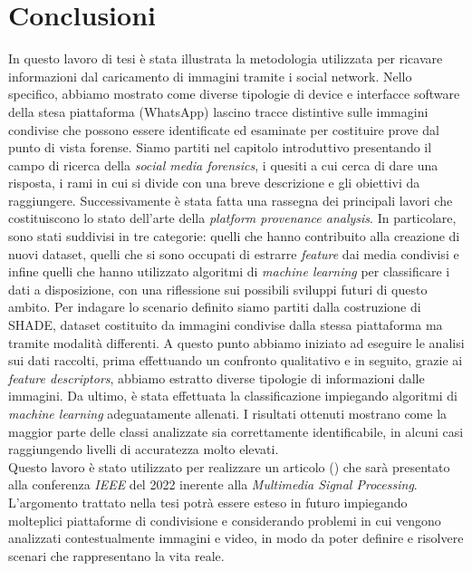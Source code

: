 \chapter{Conclusioni}
\label{cha:conclusioni}

 In questo lavoro di tesi è stata illustrata la metodologia utilizzata per ricavare informazioni dal caricamento di immagini tramite i social network. Nello specifico, abbiamo mostrato come diverse tipologie di device e interfacce software della stesa piattaforma (WhatsApp) lascino tracce distintive sulle immagini condivise che possono essere identificate ed esaminate per costituire prove dal punto di vista forense. Siamo partiti nel capitolo introduttivo presentando il campo di ricerca della \textit{social media forensics}, i quesiti a cui cerca di dare una risposta, i rami in cui si divide con una breve descrizione e gli obiettivi da raggiungere. Successivamente è stata fatta una rassegna dei principali lavori che costituiscono lo stato dell'arte della \textit{platform provenance analysis}. In particolare, sono stati suddivisi in tre categorie: quelli che hanno contribuito alla creazione di nuovi dataset, quelli che si sono occupati di estrarre \textit{feature} dai media condivisi e infine quelli che hanno utilizzato algoritmi di \textit{machine learning} per classificare i dati a disposizione, con una riflessione sui possibili sviluppi futuri di questo ambito. Per indagare lo scenario definito siamo partiti dalla costruzione di SHADE, dataset costituito da immagini condivise dalla stessa piattaforma ma tramite modalità differenti. A questo punto abbiamo iniziato ad eseguire le analisi sui dati raccolti, prima effettuando un confronto qualitativo e in seguito, grazie ai \textit{feature descriptors}, abbiamo estratto diverse tipologie di informazioni dalle immagini. Da ultimo, è stata effettuata la classificazione impiegando algoritmi di \textit{machine learning} adeguatamente allenati. I risultati ottenuti mostrano come la maggior parte delle classi analizzate sia correttamente identificabile, in alcuni casi raggiungendo livelli di accuratezza molto elevati.\\
 Questo lavoro è stato utilizzato per realizzare un articolo (\cite{tomasoni2022device}) che sarà presentato alla conferenza \textit{IEEE} del 2022 inerente alla \textit{Multimedia Signal Processing}. L'argomento trattato nella tesi potrà essere esteso in futuro impiegando molteplici piattaforme di condivisione e considerando problemi in cui vengono analizzati contestualmente immagini e video, in modo da poter definire e risolvere scenari che rappresentano la vita reale.\newpage
